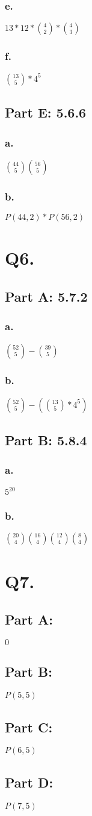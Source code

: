\documentclass[titlepage]{article}\pagestyle{empty}
\begin{document}
\subsubsection*{e.} $13 * 12 * \binom{4}{2} * \binom{4}{3}$
\subsubsection*{f.} $\binom{13}{5}*4^5$
\subsection*{Part E: 5.6.6}
\subsubsection*{a.} $\binom{44}{5}\binom{56}{5}$
\subsubsection*{b.} $P(44, 2) * P(56, 2)$

\pagebreak
\section*{Q6.}
\subsection*{Part A: 5.7.2}
\subsubsection*{a.} $\binom{52}{5}-\binom{39}{5}$
\subsubsection*{b.} $\binom{52}{5}-(\binom{13}{5}*4^5)$
\subsection*{Part B: 5.8.4}
\subsubsection*{a.} $5^{20}$
\subsubsection*{b.} $\binom{20}{4}\binom{16}{4}\binom{12}{4}\binom{8}{4}$

\pagebreak
\section*{Q7.}
\subsection*{Part A:} $0$
\subsection*{Part B:} $P(5, 5)$
\subsection*{Part C:} $P(6, 5)$
\subsection*{Part D:} $P(7, 5)$
\end{document}
